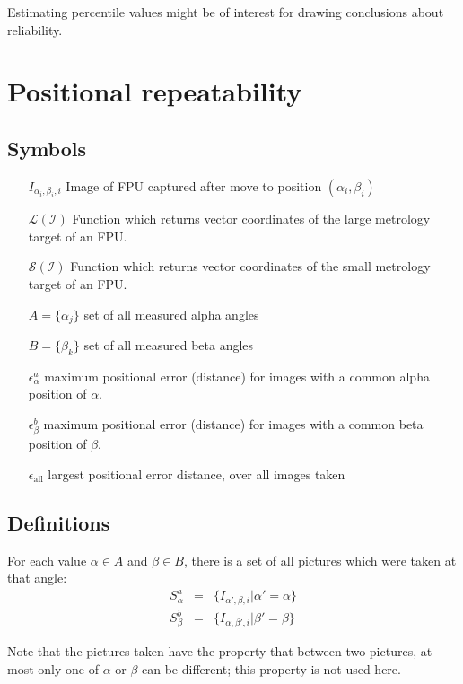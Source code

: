 \documentclass[11pt,a4paper,twoside]{scrartcl}
\begin{document}
Estimating percentile values might be of interest for drawing
conclusions about reliability.

\section{Positional repeatability}
\subsection{Symbols}
\begin{itemize}
  \item[]
\item[$I_{\alpha_i,\beta_i,i}$] Image of FPU captured after move to position $(\alpha_i,\beta_i)$
\item[$\mathcal{L(I)}$] Function which returns vector coordinates of
  the large metrology target of an FPU.
\item[$\mathcal{S(I)}$] Function which returns vector coordinates of
  the small metrology target of an FPU.
\item[$A = \{ \alpha_j\}$] set of all measured alpha angles
\item[$B = \{ \beta_k\}$] set of all measured beta angles
  \item[$\epsilon^{a}_\alpha$] maximum positional error (distance) for images with a common
    alpha position of $\alpha$.
  \item[$\epsilon^{b}_\beta$] maximum positional error (distance) for images with a common
    beta position of $\beta$.
    \item[$\epsilon_\mathrm{all}$] largest positional error distance,
      over all images taken
\end{itemize}

\subsection{Definitions}
For each value $\alpha \in A$ and $\beta \in B$, there is a set of all
pictures which were taken at that angle:
\begin{eqnarray}
  S^a_\alpha & = &  \{ I_{\alpha',\beta,i} | \alpha' = \alpha \} \\
  S^b_\beta & = &  \{ I_{\alpha,\beta',i} | \beta' = \beta \}
\end{eqnarray}

Note that the pictures taken have the property that between two
pictures, at most only one of $\alpha$ or $\beta$ can be different;
this property is not used here.
\end{document}
